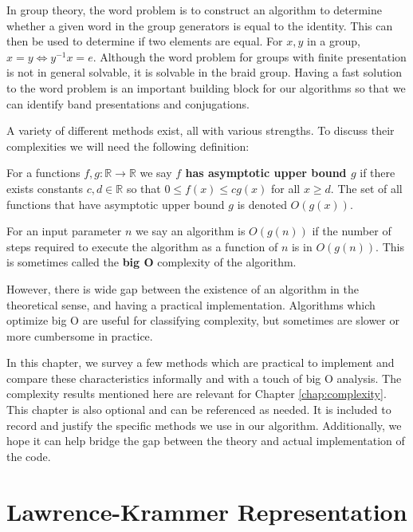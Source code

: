 \documentclass[12pt]{thesis}
\begin{document}
\label{chap:word-problem}

In group theory, the word problem is
to construct an algorithm to determine whether a given word
in the group generators is equal
to the identity.
This can then be used to determine if two elements are equal.
For $x, y$ in a group, $x = y \Leftrightarrow y^{-1}x = e$.
Although the word problem for groups with finite presentation is not in general solvable,
it is solvable in the braid group.
Having a fast solution to the word problem is an important building block for our algorithms
so that we can identify band presentations
and conjugations.

A variety of different methods exist, all with various strengths.
To discuss their complexities we will need the following definition:
\begin{definition}
    \cite{clrs}
    For a functions $f, g \colon \mathbb{R} \rightarrow \mathbb{R}$ 
    we say \textbf{$f$ has asymptotic upper bound $g$} if
    there exists constants $c, d \in \mathbb{R}$
    so that $0 \leq f(x) \leq cg(x)$ for all $x \geq d$.
    The set of all functions that have asymptotic upper bound $g$
    is denoted $O(g(x))$.
\end{definition}
\begin{definition}
    For an input parameter $n$
    we say an algorithm is $O(g(n))$
    if the number of steps required to execute
    the algorithm as a function of $n$ is in $O(g(n))$.
    This is sometimes called the \textbf{big O} complexity
    of the algorithm.
\end{definition}
However, there is wide gap between the existence of an algorithm
in the theoretical sense, and having a practical implementation.
Algorithms which optimize big O are useful for classifying complexity,
but sometimes are slower or more cumbersome in practice. 

In this chapter, we survey a few methods which are practical to implement
and compare these characteristics informally and with a touch of big O analysis.
The complexity results mentioned here are relevant for Chapter \ref{chap:complexity}.
This chapter is also optional and can be referenced as needed.
It is included to record and justify the specific methods we use in our algorithm.
Additionally, we hope it can help bridge the gap between the theory 
and actual implementation of the code. 

\section{Lawrence-Krammer Representation}
\end{document}
